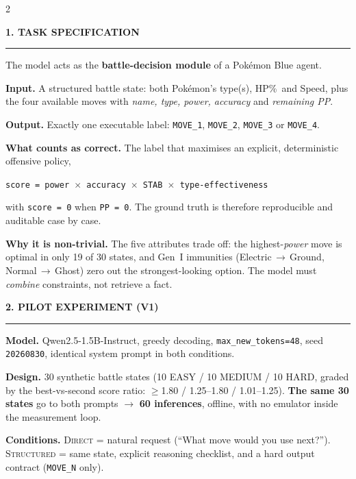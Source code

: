 \documentclass[9pt,a4paper]{extarticle}
\newcommand{\heading}[1]{%
  \par\vspace{1.4mm}\noindent
  {\color{navy}\bfseries\small\MakeUppercase{#1}}
  \par\vspace{0.7mm}\noindent
  {\color{amber}\rule{\linewidth}{1.1pt}}
  \par\vspace{0.6mm}\noindent\ignorespaces}
\begin{document}
\vspace{1.5mm}
\begin{multicols}{2}

\heading{1. Task specification}
The model acts as the \textbf{battle-decision module} of a Pok\'emon Blue agent.

\textbf{Input.} A structured battle state: both Pok\'emon's type(s), HP\%\ and Speed, plus the four available moves with \emph{name, type, power, accuracy} and \emph{remaining PP}.

\textbf{Output.} Exactly one executable label: \texttt{MOVE\_1}, \texttt{MOVE\_2}, \texttt{MOVE\_3} or \texttt{MOVE\_4}.

\textbf{What counts as correct.} The label that maximises an explicit, deterministic offensive policy,
\par\vspace{0.6mm}\noindent\hspace*{\fill}%
\colorbox{paper}{\;\texttt{score = power $\times$ accuracy $\times$ STAB $\times$ type-effectiveness}\;}%
\hspace*{\fill}\par\vspace{0.8mm}\noindent
with \texttt{score = 0} when \texttt{PP = 0}. The ground truth is therefore reproducible and auditable case by case.

\textbf{Why it is non-trivial.} The five attributes trade off: the highest-\emph{power} move is optimal in only 19 of 30 states, and Gen~I immunities (Electric\,$\to$\,Ground, Normal\,$\to$\,Ghost) zero out the strongest-looking option. The model must \emph{combine} constraints, not retrieve a fact.

\heading{2. Pilot experiment (v1)}
\textbf{Model.} Qwen2.5-1.5B-Instruct, greedy decoding, \texttt{max\_new\_tokens=48}, seed \texttt{20260830}, identical system prompt in both conditions.

\textbf{Design.} 30 synthetic battle states (10 EASY / 10 MEDIUM / 10 HARD, graded by the best-vs-second score ratio: $\geq$1.80 / 1.25--1.80 / 1.01--1.25). \textbf{The same 30 states} go to both prompts $\rightarrow$ \textbf{60 inferences}, offline, with no emulator inside the measurement loop.

\textbf{Conditions.} \textsc{Direct} = natural request (``What move would you use next?''). \textsc{Structured} = same state, explicit reasoning checklist, and a hard output contract (\texttt{MOVE\_N} only).


\end{multicols}
\end{document}
